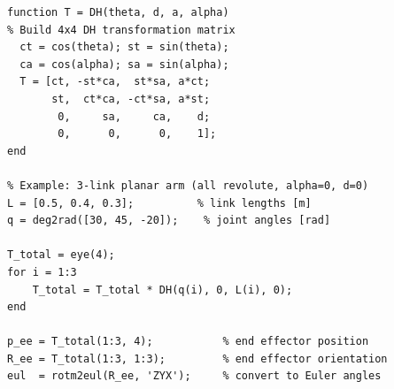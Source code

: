 \documentclass[12pt,a4paper]{article}
\begin{document}
\begin{lstlisting}[style=matlab, caption={Forward kinematics of a 3-DOF
arm using DH parameters in MATLAB.}]
function T = DH(theta, d, a, alpha)
% Build 4x4 DH transformation matrix
  ct = cos(theta); st = sin(theta);
  ca = cos(alpha); sa = sin(alpha);
  T = [ct, -st*ca,  st*sa, a*ct;
       st,  ct*ca, -ct*sa, a*st;
        0,     sa,     ca,    d;
        0,      0,      0,    1];
end

% Example: 3-link planar arm (all revolute, alpha=0, d=0)
L = [0.5, 0.4, 0.3];          % link lengths [m]
q = deg2rad([30, 45, -20]);    % joint angles [rad]

T_total = eye(4);
for i = 1:3
    T_total = T_total * DH(q(i), 0, L(i), 0);
end

p_ee = T_total(1:3, 4);           % end effector position
R_ee = T_total(1:3, 1:3);         % end effector orientation
eul  = rotm2eul(R_ee, 'ZYX');     % convert to Euler angles
\end{lstlisting}
\end{document}
